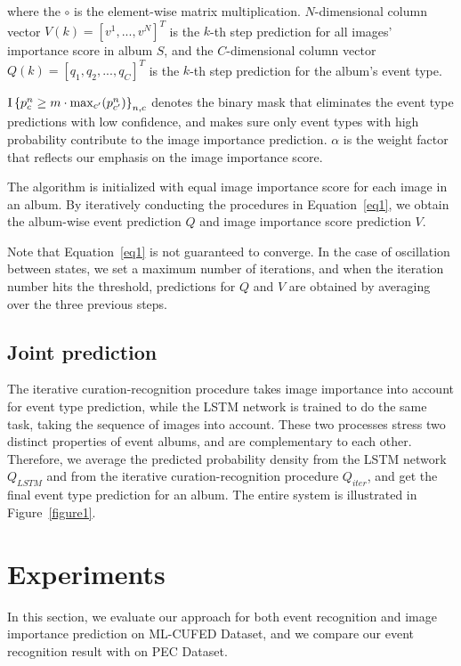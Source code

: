 \documentclass[runningheads]{llncs}
\begin{document}
where the $\circ$ is the element-wise matrix multiplication. $N$-dimensional column vector $V(k) = [v^{1}, ..., v^{N}]^{T}$ is the $k$-th step prediction for all images' importance score in album $S$, and the $C$-dimensional column vector $Q(k) = [q_{1}, q_{2},..., q_{C}]^{T}$ is the $k$-th step prediction for the album's event type.

$\textup{I}\left \{ p^{n}_{c}\geq m\cdot \max_{c'}(p^{n}_{c'}) \right \}_{n,c}$ denotes the binary mask that eliminates the event type predictions with low confidence, and makes sure only event types with high probability contribute to the image importance prediction. 
$\alpha$ is the weight factor that reflects our emphasis on the image importance score.

The algorithm is initialized with equal image importance score for each image in an album.  By iteratively conducting the procedures in Equation~\ref{eq1}, we obtain the album-wise event prediction $Q$ and image importance score prediction $V$. 

Note that Equation~\ref{eq1} is not guaranteed to converge. In the case of oscillation between states, we set a maximum number of iterations, and when the iteration number hits the threshold,  predictions for $Q$ and $V$ are obtained by averaging over the three previous steps.
\subsection{Joint prediction}
The iterative curation-recognition procedure takes image importance into account for event type prediction, while the LSTM network is trained to do the same task, taking the sequence of images into account. These two processes stress two distinct properties of  event albums, and are complementary to each other. Therefore, we average the predicted probability density from the LSTM network $Q_{LSTM}$ and from the iterative curation-recognition procedure $Q_{iter}$, and get the final event type prediction for an album. The entire system is illustrated in Figure~\ref{figure1}.



\section{Experiments}
In this section, we evaluate our approach for both event recognition and image importance prediction on ML-CUFED Dataset, and we compare our event recognition result with \cite{HMM} on PEC Dataset.
\end{document}
